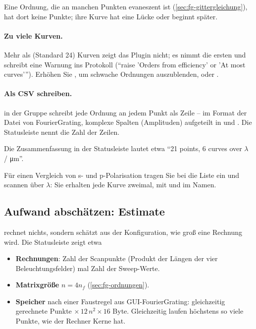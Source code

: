Eine Ordnung, die an manchen Punkten evaneszent ist (\autoref{sec:fg-gittergleichung}), hat dort
keine Punkte; ihre Kurve hat eine Lücke oder beginnt später.

\paragraph{Zu viele Kurven.} Mehr als  (Standard 24) Kurven zeigt das Plugin
nicht; es nimmt die ersten und schreibt eine Warnung ins Protokoll (\enquote{raise 'Orders from
efficiency' or 'At most curves'}). Erhöhen Sie , um schwache Ordnungen
auszublenden, oder .

\paragraph{Als CSV schreiben.}  in der Gruppe  schreibt jede Ordnung an
jedem Punkt als Zeile -- im Format der Datei  von FourierGrating, komplexe
Spalten (Amplituden) aufgeteilt in  und . Die Statusleiste nennt die Zahl der
Zeilen.

Die Zusammenfassung in der Statusleiste lautet etwa \enquote{21 points, 6 curves over $\lambda$ /
\si{\micro\metre}}.

\begin{tipp}
Für einen Vergleich von s- und p-Polarisation tragen Sie bei  die Liste
 ein und scannen über $\lambda$: Sie erhalten jede Kurve zweimal, mit
 und  im Namen.
\end{tipp}

\subsection{Aufwand abschätzen: Estimate}\label{sec:fg-estimate}

 rechnet nichts, sondern schätzt aus der Konfiguration, wie groß eine Rechnung wird.
Die Statusleiste zeigt etwa

\begin{center}
\end{center}

\begin{itemize}
  \item \textbf{Rechnungen}: Zahl der Scanpunkte (Produkt der Längen der vier Beleuchtungsfelder) mal
    Zahl der Sweep-Werte.
  \item \textbf{Matrixgröße} $n = 4 n_f$ (\autoref{sec:fg-ordnungen}).
  \item \textbf{Speicher} nach einer Faustregel aus GUI-FourierGrating: gleichzeitig gerechnete
    Punkte $\times\, 12\, n^2 \times 16$ Byte. Gleichzeitig laufen höchstens so viele Punkte, wie
    der Rechner Kerne hat.
\end{itemize}

